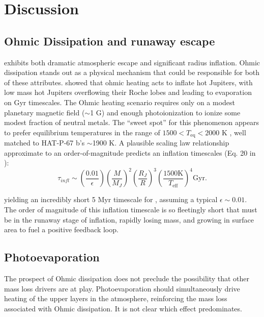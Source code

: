 \documentclass[twocolumn]{aastex631}
\newcommand{\hatpb}{\object{HAT-P-67 b}}
\begin{document}
\section{Discussion} \label{secDiscuss}

\subsection{Ohmic Dissipation and runaway escape}
 exhibits both dramatic atmospheric escape and significant radius inflation.  Ohmic dissipation stands out as a physical mechanism that could be responsible for both of these attributes.  \citet{2011ApJ...738....1B} showed that ohmic heating acts to inflate hot Jupiters, with low mass hot Jupiters overflowing their Roche lobes and leading to evaporation on Gyr timescales.  The Ohmic heating scenario requires only on a modest planetary magnetic field ($\sim$1 G) and enough photoionization to ionize some modest fraction of neutral metals.  The ``sweet spot'' for this phenomenon appears to prefer equilibrium temperatures in the range of $1500<T_\mathrm{eq}<2000$ K \citep{2011ApJ...738....1B}, well matched to HAT-P-67 b's $\sim$1900 K.  A plausible scaling law relationship approximate to an order-of-magnitude predicts an inflation timescales (Eq. 20 in \citet{2011ApJ...738....1B}):
\begin{equation}
    \tau_{\textit{infl}}\sim \left(\frac{0.01}{\epsilon} \right) \left(\frac{M}{M_{J}}\right)^2 \left(\frac{R_{J}}{R}\right)^3 \left(\frac{1500 \textrm{K}}{T_\mathrm{eff}}\right)^4 \textrm{Gyr}. \label{eqInflate}
\end{equation}


\noindent yielding an incredibly short 5 Myr timescale for \hatpb, assuming a typical $\epsilon\sim0.01$. The order of magnitude of this inflation timescale is so fleetingly short that \hatpb must be in the runaway stage of inflation, rapidly losing mass, and growing in surface area to fuel a positive feedback loop.

\subsection{Photoevaporation}
The prospect of Ohmic dissipation does not preclude the possibility that other mass loss drivers are at play.  Photoevaporation should simultaneously drive heating of the upper layers in the atmosphere, reinforcing the mass loss associated with Ohmic dissipation.  It is not clear which effect predominates.
\end{document}
